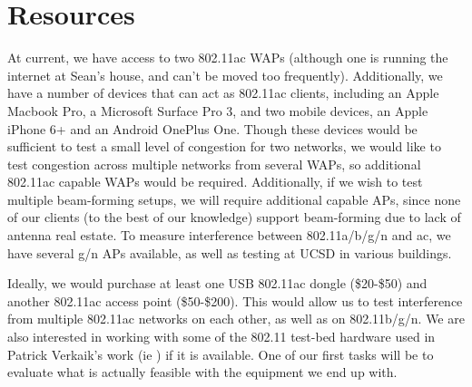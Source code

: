 \section{Resources}

At current, we have access to two 802.11ac WAPs (although one is
running the internet at Sean's house, and can't be moved too
frequently). Additionally, we have a number of devices that can act as
802.11ac clients, including an Apple Macbook Pro, a Microsoft Surface Pro 3,
and two mobile devices, an Apple iPhone 6+ and an Android OnePlus
One. Though these devices would be sufficient to test a small level
of congestion for two networks, we would like to test congestion
across multiple networks from several WAPs, so additional 802.11ac
capable WAPs would be required. Additionally, if we wish to test
multiple beam-forming setups, we will require additional capable APs, since none of
our clients (to the best of our knowledge) support beam-forming due to lack of antenna real estate. 
To measure interference between 802.11a/b/g/n and ac, we
have several g/n APs available, as well as testing at UCSD in various
buildings.

Ideally, we would purchase at least one USB 802.11ac dongle
(\$20-\$50) and another 802.11ac access point (\$50-\$200). This would
allow us to test interference from multiple 802.11ac networks on each
other, as well as on 802.11b/g/n. We are also interested in working
with some of the 802.11 test-bed hardware used in Patrick Verkaik's
work (ie \cite{kandula2009detailed}) if it is available. One of our
first tasks will be to evaluate what is actually feasible with the
equipment we end up with.
